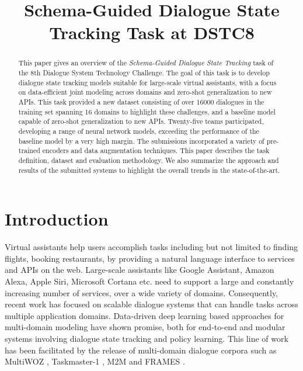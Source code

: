 \title{Schema-Guided Dialogue State Tracking Task at DSTC8}



\maketitle

\begin{abstract}
This paper gives an overview of the \textit{Schema-Guided Dialogue State Tracking} task of the 8th Dialogue System Technology Challenge. The goal of this task is to develop dialogue state tracking models suitable for large-scale virtual assistants, with a focus on data-efficient joint modeling across domains and zero-shot generalization to new APIs. This task provided a new dataset consisting of over 16000 dialogues in the training set spanning 16 domains to highlight these challenges, and a baseline model capable of zero-shot generalization to new APIs. Twenty-five teams participated, developing a range of neural network models, exceeding the performance of the baseline model by a very high margin. The submissions incorporated a variety of pre-trained encoders and data augmentation techniques. This paper describes the task definition, dataset and evaluation methodology. We also summarize the approach and results of the submitted systems to highlight the overall trends in the state-of-the-art.
\end{abstract}

\section{Introduction}
Virtual assistants help users accomplish tasks including but not limited to finding flights, booking restaurants, by providing a natural language interface to services and APIs on the web. Large-scale assistants like Google Assistant, Amazon Alexa, Apple Siri, Microsoft Cortana etc. need to support a large and constantly increasing number of services, over a wide variety of domains. Consequently, recent work has focused on scalable dialogue systems that can handle tasks across multiple application domains. Data-driven deep learning based approaches for multi-domain modeling have shown promise, both for end-to-end and modular systems involving dialogue state tracking and policy learning. This line of work has been facilitated by the release of multi-domain dialogue corpora such as MultiWOZ \cite{budzianowski2018multiwoz}, Taskmaster-1 \cite{byrne2019taskmaster}, M2M \cite{shah2018building} and FRAMES \cite{el2017frames}.

